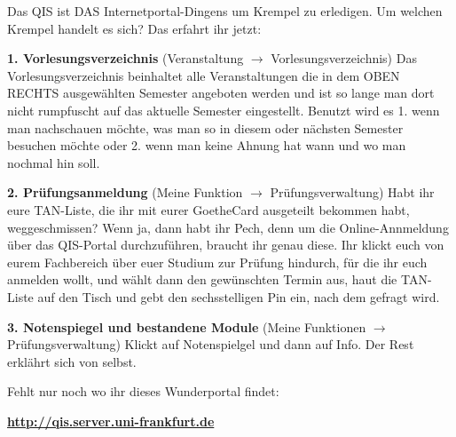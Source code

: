 Das QIS ist DAS Internetportal-Dingens um Krempel zu erledigen.
Um welchen Krempel handelt es sich? Das erfahrt ihr jetzt:

\textbf{1. Vorlesungsverzeichnis} (Veranstaltung $\rightarrow$ Vorlesungsverzeichnis)
Das Vorlesungsverzeichnis beinhaltet alle Veranstaltungen die in dem OBEN RECHTS ausgewählten
Semester angeboten werden und ist so lange man dort nicht rumpfuscht auf das aktuelle Semester eingestellt.
Benutzt wird es 1. wenn man nachschauen möchte, was man so in diesem oder nächsten Semester besuchen möchte oder
2. wenn man keine Ahnung hat wann und wo man nochmal hin soll.

\textbf{2. Prüfungsanmeldung} (Meine Funktion $\rightarrow$ Prüfungsverwaltung)
Habt ihr eure TAN-Liste, die ihr mit eurer GoetheCard ausgeteilt bekommen habt, weggeschmissen?
Wenn ja, dann habt ihr Pech, denn um die Online-Annmeldung über das QIS-Portal durchzuführen,
braucht ihr genau diese. Ihr klickt euch von eurem Fachbereich über euer Studium zur Prüfung hindurch, für die ihr euch anmelden wollt,
und wählt dann den gewünschten Termin aus, haut die TAN-Liste auf den Tisch und gebt den sechsstelligen Pin ein, nach dem gefragt wird.

\textbf{3. Notenspiegel und bestandene Module} (Meine Funktionen $\rightarrow$ Prüfungsverwaltung)
Klickt auf Notenspielgel und dann auf Info. Der Rest erklährt sich von selbst.

Fehlt nur noch wo ihr dieses Wunderportal findet:\\
\begin{center}\large\textbf{\url{http://qis.server.uni-frankfurt.de}}\end{center}
